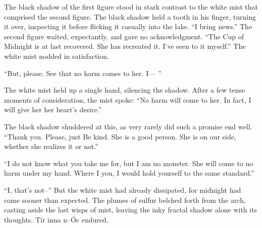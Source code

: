 The black shadow of the first figure stood in stark contrast to the white mist that comprised the second figure. The black shadow held a tooth in his finger, turning it over, inspecting it before flicking it casually into the lake.
\SmallVSpace
“I bring news.”
\SmallVSpace
The second figure waited, expectantly, and gave no acknowledgment.
\SmallVSpace
“The Cup of Midnight is at last recovered. She has recreated it. I’ve seen to it myself.”
\SmallVSpace
The white mist nodded in satisfaction.

“But, please. See that no harm comes to her. I\mbox{---} ”

The white mist held up a single hand, silencing the shadow. After a few tense moments of consideration, the mist spoke: “No harm will come to her. In fact, I will give her her heart’s desire.”

The black shadow shuddered at this, as very rarely did such a promise end well. “Thank you. Please, just{\el} Be kind. She is a good person. She is on our side, whether she realizes it or not.”

“I do not know what you take me for, but I am no monster. She will come to no harm under my hand. Where I you, I would hold yourself to the same standard.”

“I, that’s not\mbox{--}”
\SmallVSpace
But the white mist had already dissipated, for midnight had come sooner than expected. The plumes of sulfur belched forth from the arch, casting aside the last wisps of mist, leaving the inky fractal shadow alone with its thoughts.
\SomeVSpace
Tír inna n\mbox{--}Óc endured.

\simpleline


